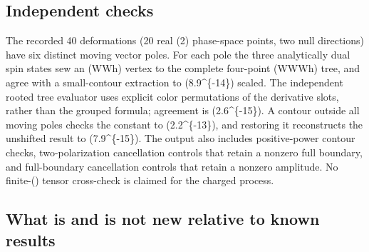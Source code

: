 \documentclass[
]{article}
\begin{document}
\subsection{Independent checks}\label{independent-checks}

The recorded 40 deformations (20 real (2) phase-space points, two
null directions) have six distinct moving vector poles. For each pole
the three analytically dual spin states sew an (WWh) vertex to the
complete four-point (WWWh) tree, and agree with a small-contour
extraction to (8.9\^{}\{-14\}) scaled. The independent rooted
tree evaluator uses explicit color permutations of the derivative slots,
rather than the grouped formula; agreement is (2.6\^{}\{-15\}).
A contour outside all moving poles checks the constant to
(2.2\^{}\{-13\}), and restoring it reconstructs the unshifted
result to (7.9\^{}\{-15\}). The output also includes
positive-power contour checks, two-polarization cancellation controls
that retain a nonzero full boundary, and full-boundary cancellation
controls that retain a nonzero amplitude. No finite-(\xi) tensor
cross-check is claimed for the charged process.

\subsection{What is and is not new relative to known
results}\label{what-is-and-is-not-new-relative-to-known-results}
\end{document}
